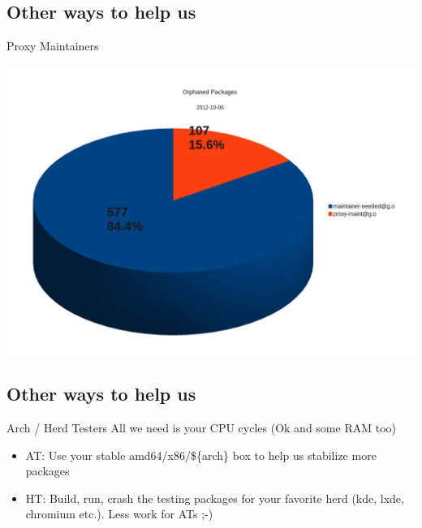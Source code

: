 \subsection{Other ways to help us}
\begin{frame}{Proxy Maintainers}
	\begin{center}
	\includegraphics[scale=0.28]{orphaned_packages.png}
	\end{center}
\end{frame}

\subsection{Other ways to help us}
\begin{frame}{Arch / Herd Testers}
All we need is your CPU cycles (Ok and some RAM too)
	\begin{itemize}
	\item AT: Use your stable amd64/x86/\$\{arch\} box to help us stabilize more packages
	\item HT: Build, run, crash the testing packages for your favorite herd (kde, lxde, chromium etc.). Less work for ATs ;-)
	\end{itemize}
\end{frame}

